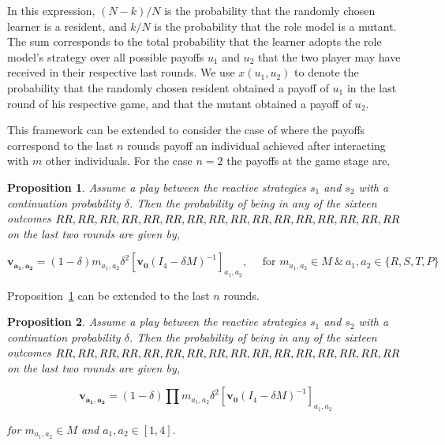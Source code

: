 \documentclass[11pt]{article}
\newcommand{\splitatcommas}[1]{%
  \begingroup
  \begingroup\lccode`~=`, \lowercase{\endgroup
    \edef~{\mathchar\the\mathcode`, \penalty0 \noexpand\hspace{0pt plus 1em}}%
  }\mathcode`,="8000 #1%
  \endgroup
}
\theoremstyle{plainCl1}
\newtheorem{Prop}{Proposition}
\theoremstyle{plainCl2}
\begin{document}
In this expression, $(N\!-\!k)/N$ is the probability that the randomly chosen
learner is a resident, and $k/N$ is the probability that the role model is a
mutant. The sum corresponds to the total probability that the learner adopts the
role model's strategy over all possible payoffs $u_1$ and $u_2$ that the two
player may have received in their respective last rounds. We use $x(u_1,u_2)$ to
denote the probability that the randomly chosen resident obtained a payoff of
$u_1$ in the last round of his respective game, and that the mutant obtained a
payoff of $u_2$.

This framework can be extended to consider the case of where the payoffs
correspond to the last \(n\) rounds payoff an individual achieved after
interacting with \(m\) other individuals. For the case \(n=2\) the payoffs
at the game stage are,

\begin{Prop}\label{proposition:last_two_rounds}
Assume a play between the reactive strategies \(s_1\) and \(s_2\) with a
continuation probability \(\delta\). Then the probability of being in any of the
sixteen outcomes \(\splitatcommas{RR, RR, RR, RR, RR, RR, RR, RR, RR, RR, RR, RR, RR, RR, RR, RR}\)
on the last two rounds are given by,

\begin{equation}
  \mathbf{v_{a_1, a_2}} = (1 - \delta) m_{a_1, a_2} \delta^2 \left[\mathbf{v_0}(I_4 - \delta M)^{-1}\right]_{a_1, a_2}, \quad \text{ for } m_{a_1, a_2} \in M \ \& \ a_1, a_2 \in \{R, S, T, P\}
\end{equation}

\end{Prop}

Proposition~\ref{proposition:last_two_rounds} can be extended to the last \(n\)
rounds.

\begin{Prop}\label{proposition:last_n_rounds}
Assume a play between the reactive strategies \(s_1\) and \(s_2\) with a
continuation probability \(\delta\). Then the probability of being in any of the
sixteen outcomes \(\splitatcommas{RR, RR, RR, RR, RR, RR, RR, RR, RR, RR, RR, RR, RR, RR, RR, RR}\)
on the last two rounds are given by,

\begin{equation}
  \mathbf{v_{a_1, a_2}} = (1 - \delta) \prod m_{a_1, a_2} \delta^2 \left[\mathbf{v_0}(I_4 - \delta M)^{-1}\right]_{a_1, a_2}
\end{equation}

for \(m_{a_1, a_2} \in M\) and \(a_1, a_2 \in [1, 4]\).
\end{Prop}
\end{document}
